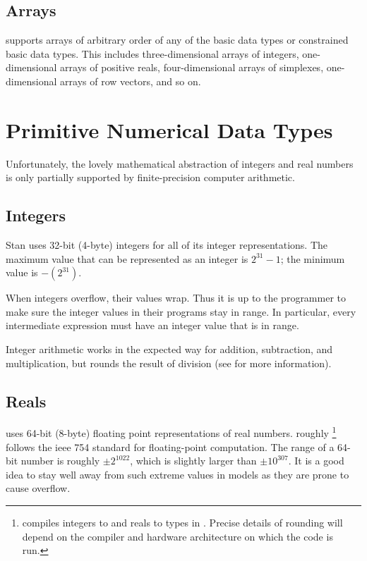 \subsection{Arrays}

\Stan supports arrays of arbitrary order of any of the basic data
types or constrained basic data types.  This includes
three-dimensional arrays of integers, one-dimensional arrays of
positive reals, four-dimensional arrays of simplexes, one-dimensional
arrays of row vectors, and so on.



\section{Primitive Numerical Data Types}

Unfortunately, the lovely mathematical abstraction of integers and
real numbers is only partially supported by finite-precision computer
arithmetic.  

\subsection{Integers}\label{int-data-type.section}

Stan uses 32-bit (4-byte) integers for all of its integer
representations.  The maximum value that can be represented
as an integer is $2^{31}-1$; the minimum value is $-(2^{31})$.

When integers overflow, their values wrap.  Thus it is up to the \Stan
programmer to make sure the integer values in their programs stay in
range.  In particular, every intermediate expression must have an
integer value that is in range.

Integer arithmetic works in the expected way for addition,
subtraction, and multiplication, but rounds the result of division
(see  for more information).

\subsection{Reals}\label{real-data-type.section}

\Stan uses 64-bit (8-byte) floating point representations of real
numbers.  \Stan roughly%
%
\footnote{\Stan compiles integers to  and reals to
   types in \Cpp.  Precise details of rounding will depend
  on the compiler and hardware architecture on which the code is run.}
%
follows the {\sc ieee} 754 standard for floating-point computation.
The range of a 64-bit number is roughly $\pm 2^{1022}$, which is
slightly larger than $\pm 10^{307}$.  It is a good idea to stay well
away from such extreme values in \Stan models as they are prone to
cause overflow.

